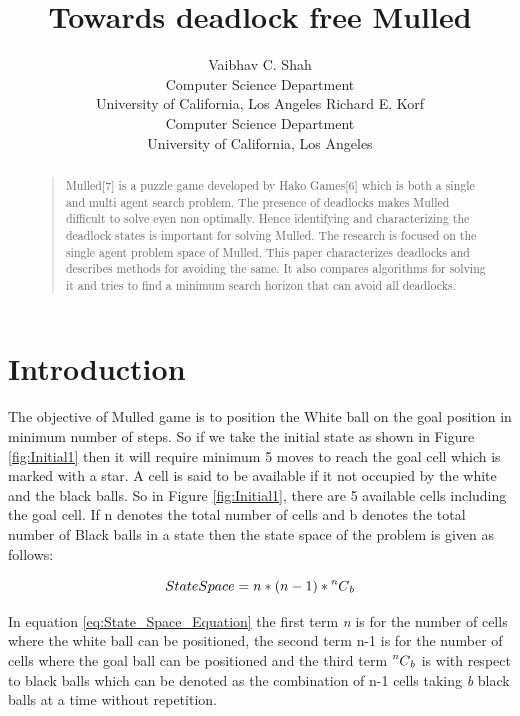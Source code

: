 \documentclass[letterpaper]{article}
\newcommand{\Mycomb}[2][n]{\prescript{#1\mkern-0.5mu}{}C_{#2}}
\begin{document}
%
\title{Towards deadlock free Mulled}
\author{Vaibhav C. Shah \\ Computer Science Department \\ University of California, Los Angeles \And
Richard E. Korf \\ Computer Science Department \\ University of California, Los Angeles}

\nocopyright

\maketitle
\begin{abstract}
\begin{quote}
Mulled[7] is a puzzle game developed by Hako Games[6] which is both a single and multi agent search problem. The presence of deadlocks makes Mulled difficult to solve even non optimally. Hence identifying and characterizing the deadlock states is important for solving Mulled. The research is focused on the single agent problem space of Mulled. This paper characterizes deadlocks and describes methods for avoiding the same. It also compares algorithms for solving it and tries to find a minimum search horizon that can avoid all deadlocks.
\end{quote}
\end{abstract}

\section{Introduction}
The objective of Mulled game is to position the White ball on the goal position in minimum number of steps. So if we take the initial state as shown in Figure \ref{fig:Initial1} then it will require minimum 5 moves to reach the goal cell which is marked with a star. A cell is said to be available if it not occupied by the white and the black balls. So in Figure \ref{fig:Initial1}, there are 5 available cells including the goal cell. If n denotes the total number of cells and b denotes the total number of Black balls in a state then the state space of the problem is given as follows:

\begin{equation}
State Space = n * (n-1) * \Mycomb{b}
\label{eq:State_Space_Equation}
\end{equation}

In equation \ref{eq:State_Space_Equation} the first term \emph{n} is for the number of cells where the white ball can be positioned, the second term n-1 is for the number of cells where the goal ball can be positioned and the third term  $\Mycomb{b}$ is with respect to black balls which can be denoted as the combination of n-1 cells taking \emph{b} black balls at a time without repetition.
\end{document}
